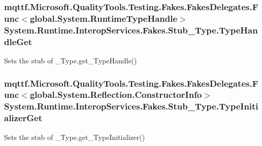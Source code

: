 \hypertarget{class_system_1_1_runtime_1_1_interop_services_1_1_fakes_1_1_stub___type_aa126a3f77824953d9fd601fcf0624ce6}{
\subsubsection[{Type\-Handle\-Get}]{\setlength{\rightskip}{0pt plus 5cm}mqttf.\-Microsoft.\-Quality\-Tools.\-Testing.\-Fakes.\-Fakes\-Delegates.\-Func$<$global.\-System.\-Runtime\-Type\-Handle$>$ System.\-Runtime.\-Interop\-Services.\-Fakes.\-Stub\-\_\-\-Type.\-Type\-Handle\-Get}}\label{class_system_1_1_runtime_1_1_interop_services_1_1_fakes_1_1_stub___type_aa126a3f77824953d9fd601fcf0624ce6}


Sets the stub of \-\_\-\-Type.\-get\-\_\-\-Type\-Handle()

\hypertarget{class_system_1_1_runtime_1_1_interop_services_1_1_fakes_1_1_stub___type_a25caed0765fd91d46ca385ff17bd7a32}{
\subsubsection[{Type\-Initializer\-Get}]{\setlength{\rightskip}{0pt plus 5cm}mqttf.\-Microsoft.\-Quality\-Tools.\-Testing.\-Fakes.\-Fakes\-Delegates.\-Func$<$global.\-System.\-Reflection.\-Constructor\-Info$>$ System.\-Runtime.\-Interop\-Services.\-Fakes.\-Stub\-\_\-\-Type.\-Type\-Initializer\-Get}}\label{class_system_1_1_runtime_1_1_interop_services_1_1_fakes_1_1_stub___type_a25caed0765fd91d46ca385ff17bd7a32}


Sets the stub of \-\_\-\-Type.\-get\-\_\-\-Type\-Initializer()

